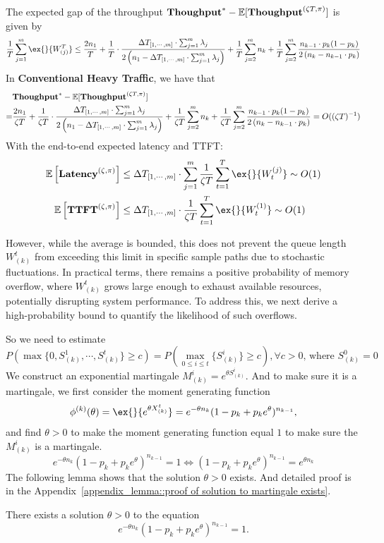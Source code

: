 The expected gap of the throughput $\textbf{Thoughput}^* - \mathbb{E}[\textbf{Thoughput}^{(\zeta T, \pi)}]$ is given by
$$\frac{1}{T}\sum_{j=1}^m \ex{}{W^T_{(j)}}\leq
\frac{2n_1}{T} +\frac{1}{T} \cdot\frac{\Delta T_{ [1,\cdots,m] }\cdot \sum_{j=1}^m \lambda_j}{2\left( n_1 - \Delta T_{ [1,\cdots,m] }\cdot \sum_{j=1}^m \lambda_j\right)} +\frac{1}{T}\sum_{j=2}^m n_k +\frac{1}{T}\sum_{j=2}^m\frac{n_{k-1}\cdot p_k(1-p_k)}{2\left(n_{k}-n_{k-1}\cdot p_k\right)}$$
In \textbf{Conventional Heavy Traffic}, we have that
\begin{align*}
&\textbf{Thoughput}^* - \mathbb{E}[\textbf{Thoughput}^{(\zeta T, \pi)}] \\
=& \frac{2n_1}{\zeta T} +\frac{1}{\zeta T} \cdot\frac{\Delta T_{ [1,\cdots,m] }\cdot \sum_{j=1}^m \lambda_j}{2\left( n_1 - \Delta T_{ [1,\cdots,m] }\cdot \sum_{j=1}^m \lambda_j\right)} +\frac{1}{\zeta T}\sum_{j=2}^m n_k +\frac{1}{\zeta T}\sum_{j=2}^m\frac{n_{k-1}\cdot p_k(1-p_k)}{2\left(n_{k}-n_{k-1}\cdot p_k\right)} = O((\zeta T)^{-1})
\end{align*}
With the end-to-end expected latency and TTFT:
\begin{align*}
\mathbb{E}\left[ \Latency^{(\zeta, \pi)} \right]&\leq \Delta T_{[1,\cdots,m]}\cdot \sum_{j=1}^m \frac{1}{\zeta T}\sum_{t=1}^T\ex{}{W_t^{(j)}} \sim O(1)\\
\mathbb{E}\left[ \TTFT^{(\zeta, \pi)} \right]&\leq \Delta T_{[1,\cdots,m]}\cdot \frac{1}{\zeta T}\sum_{t=1}^T\ex{}{W_t^{(1)}} \sim O(1)
\end{align*}


However, while the average is bounded, this does not prevent the queue length $W^t_{(k)}$ from exceeding this limit in specific sample paths due to stochastic fluctuations. In practical terms, there remains a positive probability of memory overflow, where $W^t_{(k)}$ grows large enough to exhaust available resources, potentially disrupting system performance. To address this, we next derive a high-probability bound to quantify the likelihood of such overflows.

So we need to estimate 
$$P\left( \max\{0,S^1_{(k)},\cdots,S^t_{(k)}\} \ge c\right)=P\left( \max_{0\leq i\leq t}\{S^i_{(k)}\} \ge c\right), \forall c>0 ,\,\text{where }S^0_{(k)}=0$$
We construct an exponential martingale $M^i_{(k)} = e^{\theta S^i_{(k)}}$. And to make sure it is a martingale, we first consider the moment generating function
$$\phi^{(k)}(\theta) = \ex{}{e^{\theta X_{(k)}^t}}= e^{-\theta n_{k}}(1-p_k+p_ke^{\theta})^{n_{k-1}},$$
and find $\theta>0$ to make the moment generating function equal $1$ to make sure the $M^i_{(k)}$ is a martingale.
$$ e^{-\theta n_{k}}(1-p_k+p_ke^{\theta})^{n_{k-1}} = 1 \iff (1-p_k+p_ke^{\theta})^{n_{k-1}} = e^{\theta n_{k}}$$
The following lemma shows that the solution $\theta>0$ exists. And detailed proof is in the Appendix~\ref{appendix_lemma::proof of solution to martingale exists}.
\begin{lemma}\label{lemma::solution to martingale exists}
There exists a solution \(\theta > 0\) to the equation
\[
e^{-\theta n_{k}} (1 - p_k + p_k e^{\theta})^{n_{k-1}} = 1.
\]
\end{lemma}

